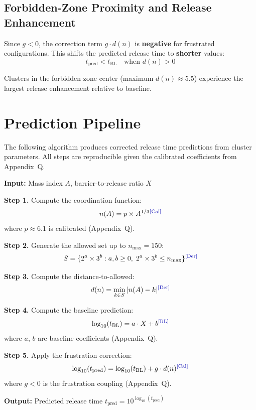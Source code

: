 \subsection{Forbidden-Zone Proximity and Release Enhancement}

Since $g < 0$, the correction term $g \cdot d(n)$ is \textbf{negative} for
frustrated configurations. This shifts the predicted release time to
\textbf{shorter} values:
\begin{equation}
    t_{\text{pred}} < t_{\text{BL}} \quad \text{when } d(n) > 0
\end{equation}

Clusters in the forbidden zone center (maximum $d(n) \approx 5.5$) experience
the largest release enhancement relative to baseline. \tagP

\section{Prediction Pipeline}
\label{sec:sh:pipeline}

The following algorithm produces corrected release time predictions from
cluster parameters. All steps are reproducible given the calibrated
coefficients from Appendix~Q.

\begin{derivationbox}[title=Prediction Algorithm]
\textbf{Input:} Mass index $A$, barrier-to-release ratio $X$

\textbf{Step 1.} Compute the coordination function:
\begin{equation}
    n(A) = p \times A^{1/3} \tagCal
\end{equation}
where $p \approx 6.1$ is calibrated (Appendix~Q).

\textbf{Step 2.} Generate the allowed set up to $n_{\max} = 150$:
\begin{equation}
    S = \{2^a \times 3^b : a, b \geq 0, \; 2^a \times 3^b \leq n_{\max}\} \tagDer
\end{equation}

\textbf{Step 3.} Compute the distance-to-allowed:
\begin{equation}
    d(n) = \min_{k \in S} |n(A) - k| \tagDer
\end{equation}

\textbf{Step 4.} Compute the baseline prediction:
\begin{equation}
    \log_{10}(t_{\text{BL}}) = a \cdot X + b \tagBL
\end{equation}
where $a$, $b$ are baseline coefficients (Appendix~Q).

\textbf{Step 5.} Apply the frustration correction:
\begin{equation}
    \log_{10}(t_{\text{pred}}) = \log_{10}(t_{\text{BL}}) + g \cdot d(n) \tagCal
\end{equation}
where $g < 0$ is the frustration coupling (Appendix~Q).

\textbf{Output:} Predicted release time $t_{\text{pred}} = 10^{\log_{10}(t_{\text{pred}})}$
\end{derivationbox}

